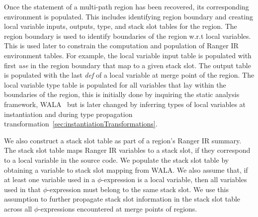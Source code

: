 Once the statement of a multi-path region has been recovered, its corresponding environment is populated.
%
This includes identifying region boundary and creating local variable inputs, outputs, type, and stack slot tables for
the region.
%
The region boundary is used to identify boundaries of the region w.r.t local variables.
%
This is used later to constrain the computation and population of Ranger IR environment tables.
%
For example, the local variable input table is populated with first \textit{use} in the region boundary that map to a given stack slot.
%
The output table is populated with the last \textit{def} of a local variable at merge point of the region.
%
The local variable type table is populated for all variables that lay within the boundaries of the region, this is initially done by
inquiring the static analysis framework, WALA~\cite{Wala} but is later changed by inferring types of local variables
at instantiation and during type propagation transformation~\ref{sec:instantiationTransformations}.

We also construct a stack slot table as part of a region\rq s Ranger IR summary.
%
The stack slot table maps Ranger IR variables to a stack slot, if they correspond to a local variable in the source code.
%
We populate the stack slot table by obtaining a variable to stack slot mapping from WALA.
%
We also assume that, if at least one variable used in a $\phi$-expression is a local variable, then all variables
used in that $\phi$-expression must belong to the same stack slot.
%
We use this assumption to further propagate stack slot information in the stack slot table across all $\phi$-expressions
encountered at merge points of regions.




